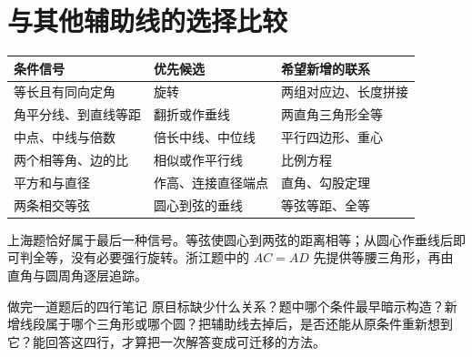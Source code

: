 \documentclass[lang=cn,12pt,fontset=none,a4paper,openany]{beautybook}
\begin{document}
\section{与其他辅助线的选择比较}
\begin{center}\small
\begin{tabular}{p{.25\linewidth}p{.28\linewidth}p{.32\linewidth}}
\toprule
条件信号&优先候选&希望新增的联系\\\midrule
等长且有同向定角&旋转&两组对应边、长度拼接\\
角平分线、到直线等距&翻折或作垂线&两直角三角形全等\\
中点、中线与倍数&倍长中线、中位线&平行四边形、重心\\
两个相等角、边的比&相似或作平行线&比例方程\\
平方和与直径&作高、连接直径端点&直角、勾股定理\\
两条相交等弦&圆心到弦的垂线&等弦等距、全等\\\bottomrule
\end{tabular}\end{center}
上海题恰好属于最后一种信号。等弦使圆心到两弦的距离相等；从圆心作垂线后即可判全等，没有必要强行旋转。浙江题中的 $AC=AD$ 先提供等腰三角形，再由直角与圆周角逐层追踪。

\begin{keybox}{做完一道题后的四行笔记}
原目标缺少什么关系？题中哪个条件最早暗示构造？新增线段属于哪个三角形或哪个圆？把辅助线去掉后，是否还能从原条件重新想到它？能回答这四行，才算把一次解答变成可迁移的方法。
\end{keybox}
\end{document}
